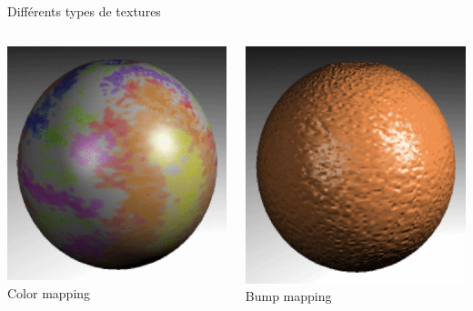 \begin{frame}[t]{Différents types de textures}
  \begin{columns}
\begin{column}{.49\textwidth}
\includegraphics[width=\columnwidth]{figs/cmap.png} \\
Color mapping
\end{column}
\begin{column}{.49\textwidth}
\includegraphics[width=\columnwidth]{figs/bmap.png} \\
Bump mapping
\end{column}
  \end{columns}
\end{frame}


